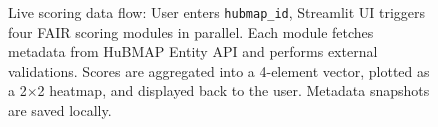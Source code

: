 \begin{figure}[h!]
\caption{Live scoring data flow: User enters \texttt{hubmap\_id}, Streamlit UI triggers four FAIR scoring modules in parallel. Each module fetches metadata from HuBMAP Entity API and performs external validations. Scores are aggregated into a 4-element vector, plotted as a 2$\times$2 heatmap, and displayed back to the user. Metadata snapshots are saved locally.}
\label{fig:live_scoring}
\end{figure}

